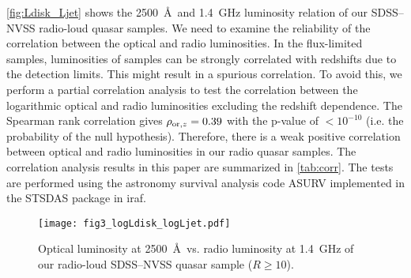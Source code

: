 \documentclass[preprint2,twocolappendix]{aastex6}
\begin{document}
\autoref{fig:Ldisk_Ljet} shows the 2500~\AA~and 1.4~GHz luminosity relation of our SDSS--NVSS radio-loud quasar samples. We need to examine the reliability of the correlation between the optical and radio luminosities. In the flux-limited samples, luminosities of samples can be strongly correlated with redshifts due to the detection limits. This might result in a spurious correlation. To avoid this, we perform a partial correlation analysis \citep[see e.g.][]{pad92,ghi11,ino11} to test the correlation between the logarithmic optical and radio luminosities excluding the redshift dependence. The Spearman rank correlation gives $\rho_{{\rm or},z}=0.39$ with the p-value of $<10^{-10}$ (i.e. the probability of the null hypothesis). Therefore, there is a weak positive correlation between optical and radio luminosities in our radio quasar samples. The correlation analysis results in this paper are summarized in \autoref{tab:corr}. The tests are performed using the astronomy survival analysis code ASURV \citep{lav92} implemented in the STSDAS package in iraf. 

\begin{figure}[t]
 \begin{center}
  \texttt{[image: fig3\_logLdisk\_logLjet.pdf]} 
 \end{center}
\caption{Optical luminosity at 2500~\AA~vs. radio luminosity at 1.4~GHz of our radio-loud SDSS--NVSS quasar sample ($R\geq10$). }\label{fig:Ldisk_Ljet}
\end{figure}
\end{document}
